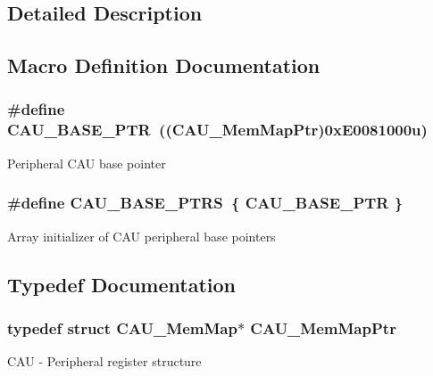 \subsection{Detailed Description}


\subsection{Macro Definition Documentation}
\hypertarget{group___c_a_u___peripheral_gaf2a80b84a866e513ee484bbb861fa36d}{}
\subsubsection[{C\+A\+U\+\_\+\+B\+A\+S\+E\+\_\+\+P\+T\+R}]{\setlength{\rightskip}{0pt plus 5cm}\#define C\+A\+U\+\_\+\+B\+A\+S\+E\+\_\+\+P\+T\+R~(({\bf C\+A\+U\+\_\+\+Mem\+Map\+Ptr})0x\+E0081000u)}\label{group___c_a_u___peripheral_gaf2a80b84a866e513ee484bbb861fa36d}
Peripheral C\+A\+U base pointer \hypertarget{group___c_a_u___peripheral_gaadc82a2eed7dcf40fa9a17abe0f2ff6e}{}
\subsubsection[{C\+A\+U\+\_\+\+B\+A\+S\+E\+\_\+\+P\+T\+R\+S}]{\setlength{\rightskip}{0pt plus 5cm}\#define C\+A\+U\+\_\+\+B\+A\+S\+E\+\_\+\+P\+T\+R\+S~\{ {\bf C\+A\+U\+\_\+\+B\+A\+S\+E\+\_\+\+P\+T\+R} \}}\label{group___c_a_u___peripheral_gaadc82a2eed7dcf40fa9a17abe0f2ff6e}
Array initializer of C\+A\+U peripheral base pointers 

\subsection{Typedef Documentation}
\hypertarget{group___c_a_u___peripheral_ga207de3afa3c0fec8cef914aa8027fc35}{}
\subsubsection[{C\+A\+U\+\_\+\+Mem\+Map\+Ptr}]{\setlength{\rightskip}{0pt plus 5cm}typedef struct {\bf C\+A\+U\+\_\+\+Mem\+Map}$\ast$ {\bf C\+A\+U\+\_\+\+Mem\+Map\+Ptr}}\label{group___c_a_u___peripheral_ga207de3afa3c0fec8cef914aa8027fc35}
C\+A\+U -\/ Peripheral register structure 